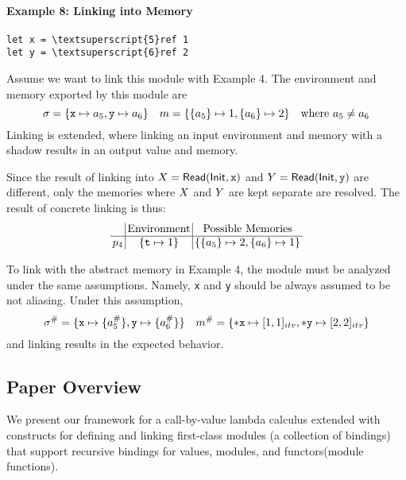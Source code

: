 \documentclass{article}
\begin{document}
\paragraph{Example 8: Linking into Memory}
\begin{center}
  \begin{BVerbatim}[commandchars=\\\{\}]
let x = \textsuperscript{5}ref 1
let y = \textsuperscript{6}ref 2
  \end{BVerbatim}
\end{center}

Assume we want to link this module with Example 4.
The environment and memory exported by this module are
\[\sigma=\{\texttt{x}\mapsto a_5,\texttt{y}\mapsto a_6\}\quad m=\{\{a_5\}\mapsto 1,\{a_6\}\mapsto 2\}\quad\text{where }a_5\neq a_6\]
Linking is extended, where linking an input environment and memory
with a shadow results in an output value and memory.

Since the result of linking into ${X}=\mathsf{Read}(\mathsf{Init},\texttt{x})$ and
${Y}=\mathsf{Read}(\mathsf{Init},\texttt{y})$ are different,
only the memories where ${X}$ and ${Y}$ are kept
separate are resolved.
The result of concrete linking is thus:
\[
  \setlength{\arraycolsep}{2pt}
  \begin{array}{c|c|c}
              & \text{Environment}                                      & \text{Possible Memories}                                                                                                                                                                \\
    \hline
    \ppoint_4 & \{\texttt{t}\mapsto 1\} & \{\{a_5\}\mapsto 2,\{a_6\}\mapsto 1\}
  \end{array}
\]

To link with the abstract memory in Example 4, the module
must be analyzed under the same assumptions.
Namely, \texttt{x} and \texttt{y} should be always assumed
to be not aliasing.
Under this assumption,
\[
  {\sigma}^{\#}=\{\texttt{x}\mapsto\{{a}^{\#}_5\},\texttt{y}\mapsto\{{a}^{\#}_6\}\}\quad
  {m}^{\#}=\{*\texttt{x}\mapsto[1,1]_{{itv}},*\texttt{y}\mapsto[2,2]_{{itv}}\}
\]
and linking results in the expected behavior.

\subsection{Paper Overview}
We present our framework for a call-by-value lambda calculus extended
with constructs for defining and linking first-class modules (a
collection of bindings) that support recursive bindings for values,
modules, and functors(module functions).
\end{document}
